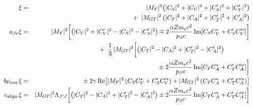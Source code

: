 %
%
%
\begin{eqnarray}
    \xi &=& 
    	|M_F|^2   \! \left( |C_S|^2 + |C_V|^2 + |C_S^\prime|^2 + |C_V^\prime|^2 \right) 
		\nonumber \\ && 
		+ \;\; 
		|M_{GT}|^2 \left( |C_T|^2 + |C_A|^2 + |C_T^\prime|^2 + |C_A^\prime|^2 \right)
		\label{eq:jtw_xi} 
	\\
	\a \xi &=& 
		|M_F|^2 \! \left[ \left( |C_V|^2 + |C_V^\prime|^2 - |C_S|^2 - |C_S^\prime|^2 \right) 
		\mp %
		2 \frac{\alpha Z \me c^2}{\pbeta c}\,\textrm{Im}\!\left[ C_S C_V^* + C_S^\prime C_V^{\prime *} \right]
		\right] 
		\nonumber \\
		&& + \;\; 
		\frac{1}{3} \, |M_{GT}|^2 \! \left[ 
		\left( |C_T|^2 - |C_A|^2 + |C_T^\prime|^2 - |C_A^\prime|^2 \right) \phantom{\frac{\alpha Z \me c^2 }{\pbeta c}} \right.
		\nonumber \\ && 
		\pm \left.
		2 \frac{\alpha Z \me c^2}{\pbeta c}\,\textrm{Im}\!\left[ C_T C_A^* + C_T^\prime C_A^{\prime *} \right] %
		\right]
		\label{eq:jtw_abetanuxi}
	\\ 
    \bFierz \, \xi &=& 
		\pm \: 2\gamma \: \textrm{Re}\!\left[ |M_F|^2 \left( C_S C_V^* + C_S^\prime C_V^{\prime *} \right) 
		+ |M_{GT}|^2 \left( C_T C_A^* + C_T^{\prime} C_A^{\prime *} \right) \right] 
		\label{eq:jtw_bxi} 
    \\
	\calign \, \xi &=& 
		|M_{GT}|^2 \Lambda_{J^\prime J}\! \left[ 
		\left( |C_T|^2 - |C_A|^2 + |C_T^\prime|^2 - |C_A^\prime|^2 \right)
		\pm 
		2 \frac{\alpha Z \me c^2}{\pbeta c}\,\textrm{Im}\!\left[ C_T C_A^* + C_T^\prime C_A^{\prime *} \right]
		\right]
		\nonumber \\
		\label{eq:jtw_calignxi}
\end{eqnarray}
%
